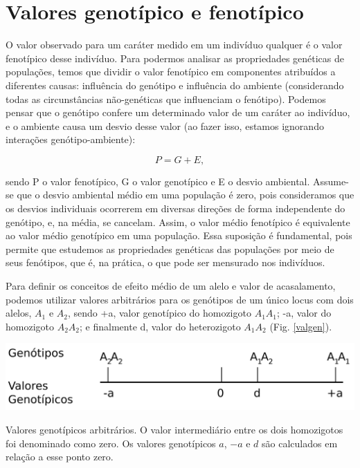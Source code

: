 \documentclass[portuges,]{tufte-handout}
\begin{document}
\section{Valores genotípico e
fenotípico}\label{valores-genotuxedpico-e-fenotuxedpico}

O valor observado para um caráter medido em um indivíduo qualquer é o
valor fenotípico desse indivíduo. Para podermos analisar as propriedades
genéticas de populações, temos que dividir o valor fenotípico em
componentes atribuídos a diferentes causas: influência do genótipo e
influência do ambiente (considerando todas as circunstâncias
não-genéticas que influenciam o fenótipo). Podemos pensar que o genótipo
confere um determinado valor de um caráter ao indivíduo, e o ambiente
causa um desvio desse valor (ao fazer isso, estamos ignorando interações
genótipo-ambiente):

\[
P = G + E,
\]

sendo P o valor fenotípico, G o valor genotípico e E o desvio ambiental.
Assume-se que o desvio ambiental médio em uma população é zero, pois
consideramos que os desvios individuais ocorrerem em diversas direções
de forma independente do genótipo, e, na média, se cancelam. Assim, o
valor médio fenotípico é equivalente ao valor médio genotípico em uma
população. Essa suposição é fundamental, pois permite que estudemos as
propriedades genéticas das populações por meio de seus fenótipos, que é,
na prática, o que pode ser mensurado nos indivíduos.

Para definir os conceitos de efeito médio de um alelo e valor de
acasalamento, podemos utilizar valores arbitrários para os genótipos de
um único locus com dois alelos, \(A_1\) e \(A_2\), sendo +a, valor
genotípico do homozigoto \(A_1\)\(A_1\); -a, valor do homozigoto
\(A_2\)\(A_2\); e finalmente d, valor do heterozigoto \(A_1\)\(A_2\)
(Fig. \ref{valgen}).

\begin{marginfigure}
\includegraphics{./figuras/valoresgenotipicos.png}
\caption{Valores genotípicos arbitrários. O valor intermediário
entre os dois homozigotos foi denominado como zero. Os valores
genotípicos \(a\), \(-a\) e \(d\) são calculados em relação a esse ponto
zero.}
\label{valgen}
\end{marginfigure}
\end{document}

